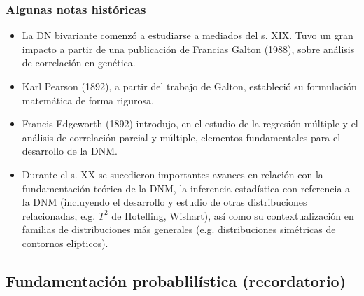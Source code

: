 \documentclass[11pt,a4paper]{article}
\begin{document}
\subsubsection{Algunas notas históricas}
\begin{itemize}
\item La DN bivariante comenzó a estudiarse a mediados del s. XIX. Tuvo un gran impacto a partir de una publicación de Francias Galton (1988), sobre análisis de correlación en genética.

\item Karl Pearson (1892), a partir del trabajo de Galton, estableció su formulación matemática de forma rigurosa.

\item Francis Edgeworth (1892) introdujo, en el estudio de la regresión múltiple y el análisis de correlación parcial y múltiple, elementos fundamentales para el desarrollo de la DNM.

\item Durante el s. XX se sucedieron importantes avances en relación con la fundamentación teórica de la DNM, la inferencia estadística con referencia a la DNM (incluyendo el desarrollo y estudio de otras distribuciones relacionadas, e.g. $T^{2}$ de Hotelling, Wishart), así como su contextualización en familias de distribuciones más generales (e.g. distribuciones simétricas de contornos elípticos).
\end{itemize}

\subsection{Fundamentación probablilística (recordatorio)}
\end{document}
